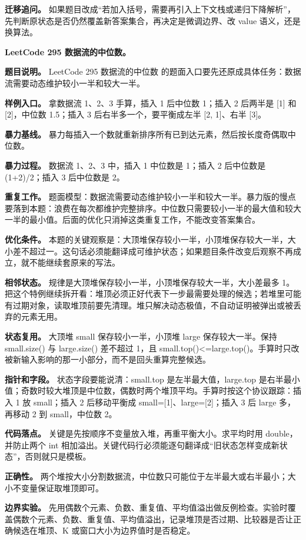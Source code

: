 \textbf{迁移追问。} 如果题目改成“若加入括号，需要再引入上下文栈或递归下降解析”，先判断原状态是否仍然覆盖新答案集合，再决定是微调边界、改 value 语义，还是换算法。

\noindent\textbf{LeetCode 295 数据流的中位数。}

\textbf{题目说明。} LeetCode 295 数据流的中位数 的题面入口要先还原成具体任务：数据流需要动态维护较小一半和较大一半。

\textbf{样例入口。} 拿数据流 1、2、3 手算，插入 1 后中位数 1；插入 2 后两半是 [1] 和 [2]，中位数 1.5；插入 3 后右半多一个，要平衡成左半 [2, 1]、右半 [3]。

\textbf{暴力基线。} 暴力每插入一个数就重新排序所有已到达元素，然后按长度奇偶取中位数。

\textbf{暴力过程。} 数据流 1、2、3 中，插入 1 中位数是 1；插入 2 后中位数是 (1+2)/2；插入 3 后中位数是 2。

\textbf{重复工作。} 题面模型：数据流需要动态维护较小一半和较大一半。暴力版的慢点要落到本题：浪费在每次都维护完整排序。中位数只需要较小一半的最大值和较大一半的最小值。后面的优化只消掉这类重复工作，不能改变答案集合。

\textbf{优化条件。} 本题的关键观察是：大顶堆保存较小一半，小顶堆保存较大一半，大小差不超过一。这句话必须能翻译成可维护状态；如果题目条件改变后观察不再成立，就不能继续套原来的写法。

\textbf{相邻状态。} 规律是大顶堆保存较小一半，小顶堆保存较大一半，大小差最多 1。把这个特例继续拆开看：堆顶必须正好代表下一步最需要处理的候选；若堆里可能有过期对象，读取堆顶前要先清理。堆只解决动态极值，不自动证明被弹出或被丢弃的元素无用。

\textbf{状态复用。} 大顶堆 small 保存较小一半，小顶堆 large 保存较大一半。保持 small.size() 与 large.size() 差不超过 1，且 small.top()<=large.top()。手算时只改被新输入影响的那一小部分，而不是回头重算完整候选。

\textbf{指针和字段。} 状态字段要能说清：small.top 是左半最大值，large.top 是右半最小值；奇数时较大堆顶是中位数，偶数时两个堆顶平均。手算时按这个协议跟踪：插入 1 放 small；插入 2 后移动平衡成 small=[1]、large=[2]；插入 3 后 large 多，再移动 2 到 small，中位数 2。

\textbf{代码落点。} 关键是先按顺序不变量放入堆，再重平衡大小。求平均时用 double，并防止两个 int 相加溢出。关键代码行必须能逐句翻译成“旧状态怎样变成新状态”，否则就只是模板。

\textbf{正确性。} 两个堆按大小分割数据流，中位数只可能位于左半最大或右半最小；大小不变量保证取堆顶即可。

\textbf{边界实验。} 先用偶数个元素、负数、重复值、平均值溢出做反例检查。实验时覆盖偶数个元素、负数、重复值、平均值溢出，记录堆顶是否过期、比较器是否让正确候选在堆顶、K 或窗口大小为边界值时是否稳定。


